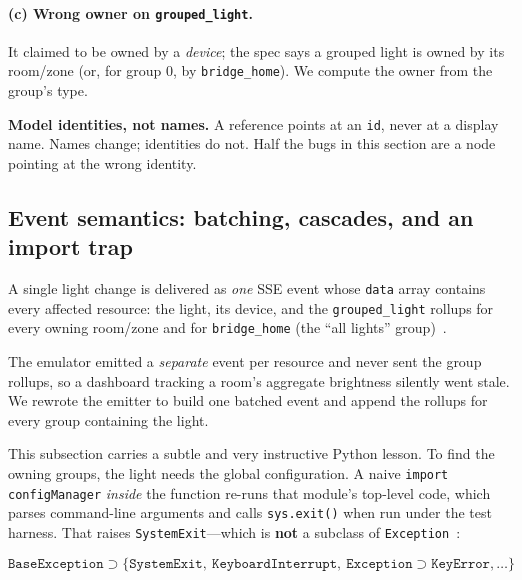 \documentclass[11pt,a4paper]{article}
\newcommand{\code}[1]{\texttt{#1}}
\begin{document}
\paragraph{(c) Wrong owner on \texttt{grouped\_light}.} It claimed to be owned by
a \emph{device}; the spec says a grouped light is owned by its room/zone (or, for
group $0$, by \code{bridge\_home}). We compute the owner from the group's type.

\begin{keyidea}
\textbf{Model identities, not names.} A reference points at an \code{id}, never
at a display name. Names change; identities do not. Half the bugs in this
section are a node pointing at the wrong identity.
\end{keyidea}

\subsection{Event semantics: batching, cascades, and an import trap}

\begin{specbox}
A single light change is delivered as \emph{one} SSE event whose \code{data}
array contains every affected resource: the light, its device, and the
\code{grouped\_light} rollups for every owning room/zone and for
\code{bridge\_home} (the ``all lights'' group)~\cite{whatwg-sse,huev2}.
\end{specbox}

The emulator emitted a \emph{separate} event per resource and never sent the
group rollups, so a dashboard tracking a room's aggregate brightness silently
went stale. We rewrote the emitter to build one batched event and append the
rollups for every group containing the light.

This subsection carries a subtle and very instructive Python lesson. To find the
owning groups, the light needs the global configuration. A naive
\code{import configManager} \emph{inside} the function re-runs that module's
top-level code, which parses command-line arguments and calls
\code{sys.exit()} when run under the test harness. That raises
\code{SystemExit}---which is \textbf{not} a subclass of \code{Exception}~\cite{pyexc}:

\[
  \texttt{BaseException} \supset \{\texttt{SystemExit},\ \texttt{KeyboardInterrupt},\ \texttt{Exception} \supset \texttt{KeyError}, \ldots\}
\]
\end{document}
